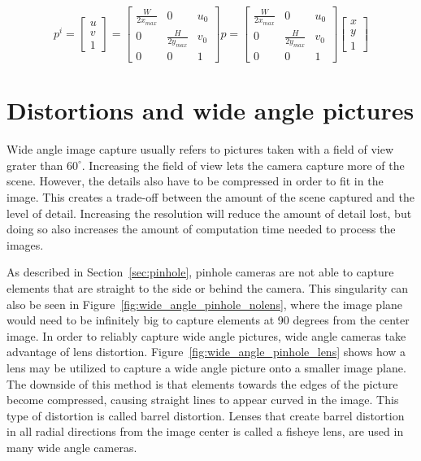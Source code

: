 \begin{equation}
    p^i = \begin{bmatrix}
        u \\ v \\ 1
    \end{bmatrix} = \begin{bmatrix}
        \frac{W}{2x_{max}} & 0 & u_0 \\
        0 & \frac{H}{2y_{max}} & v_0 \\
        0 & 0 & 1
    \end{bmatrix}p =
    \begin{bmatrix}
        \frac{W}{2x_{max}} & 0 & u_0 \\
        0 & \frac{H}{2y_{max}} & v_0 \\
        0 & 0 & 1
    \end{bmatrix}\begin{bmatrix}
        x \\ y \\ 1
    \end{bmatrix}
    \label{eq:pixel_transform}
\end{equation}

\section{Distortions and wide angle pictures}

Wide angle image capture usually refers to pictures taken with a field of view grater than $60^\circ$. Increasing the field of view lets the camera capture more of the scene. However, the details also have to be compressed in order to fit in the image. This creates a trade-off between the amount of the scene captured and the level of detail. Increasing the resolution will reduce the amount of detail lost, but doing so also increases the amount of computation time needed to process the images.

As described in Section~\ref{sec:pinhole}, pinhole cameras are not able to capture elements that are straight to the side or behind the camera. This singularity can also be seen in Figure~\ref{fig:wide_angle_pinhole_nolens}, where the image plane would need to be infinitely big to capture elements at 90 degrees from the center image. In order to reliably capture wide angle pictures, wide angle cameras take advantage of lens distortion. Figure~\ref{fig:wide_angle_pinhole_lens} shows how a lens may be utilized to capture a wide angle picture onto a smaller image plane. The downside of this method is that elements towards the edges of the picture become compressed, causing straight lines to appear curved in the image. This type of distortion is called barrel distortion. Lenses that create barrel distortion in all radial directions from the image center is called a fisheye lens, are used in many wide angle cameras.

